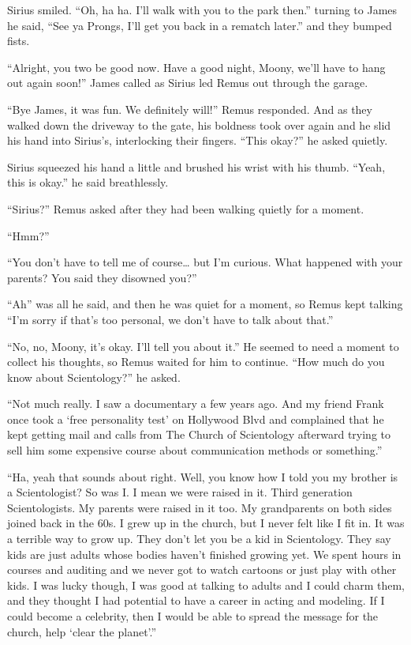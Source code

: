 \documentclass[12pt,twoside,openright]{memoir}
\begin{document}
Sirius smiled. ``Oh, ha ha. I'll walk with you to the park then.'' turning to James he said, ``See ya Prongs, I'll get you back in a rematch later.'' and they bumped fists.

``Alright, you two be good now. Have a good night, Moony, we'll have to hang out again soon!'' James called as Sirius led Remus out through the garage.

``Bye James, it was fun. We definitely will!'' Remus responded. And as they walked down the driveway to the gate, his boldness took over again and he slid his hand into Sirius's, interlocking their fingers. ``This okay?'' he asked quietly.

Sirius squeezed his hand a little and brushed his wrist with his thumb. ``Yeah, this is okay.'' he said breathlessly. 

``Sirius?'' Remus asked after they had been walking quietly for a moment.

``Hmm?''

``You don't have to tell me of course… but I'm curious. What happened with your parents? You said they disowned you?''

``Ah'' was all he said, and then he was quiet for a moment, so Remus kept talking ``I'm sorry if that's too personal, we don't have to talk about that.''

``No, no, Moony, it's okay. I'll tell you about it.'' He seemed to need a moment to collect his thoughts, so Remus waited for him to continue. ``How much do you know about Scientology?'' he asked.

``Not much really. I saw a documentary a few years ago. And my friend Frank once took a `free personality test' on Hollywood Blvd and complained that he kept getting mail and calls from The Church of Scientology afterward trying to sell him some expensive course about communication methods or something.''

``Ha, yeah that sounds about right. Well, you know how I told you my brother is a Scientologist? So was I. I mean we were raised in it. Third generation Scientologists. My parents were raised in it too. My grandparents on both sides joined back in the 60s. I grew up in the church, but I never felt like I fit in. It was a terrible way to grow up. They don't let you be a kid in Scientology. They say kids are just adults whose bodies haven't finished growing yet. We spent hours in courses and auditing and we never got to watch cartoons or just play with other kids. I was lucky though, I was good at talking to adults and I could charm them, and they thought I had potential to have a career in acting and modeling. If I could become a celebrity, then I would be able to spread the message for the church, help `clear the planet'.''
\end{document}
